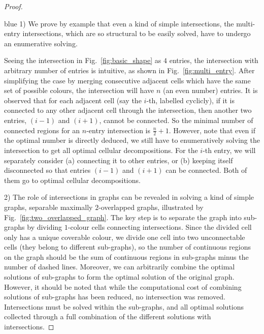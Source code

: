 \documentclass[journal]{IEEEtran}
\begin{document}
\begin{proof}
\begin{color}{blue}
1) We prove by example that even a kind of simple intersections, the multi-entry intersections, which are so structural to be easily solved, have to undergo an enumerative solving. 
\end{color}
Seeing the intersection in Fig.~\ref{fig:basic_shape} as $4$ entries, the intersection with arbitrary number of entries is intuitive, as shown in Fig.~\ref{fig:multi_entry}. 
After simplifying the case by merging consecutive adjacent cells which have the same set of possible colours, the intersection will have $n$ (an even number) entries. 
It is observed that for each adjacent cell (say the $i$-th, labelled cyclicly), if it is connected to any other adjacent cell through the intersection, then another two entries, $(i-1)$ and $(i+1)$, cannot be connected. So the minimal number of connected regions for an $n$-entry intersection is $\frac{n}{2}+1$. 
However, note that even if the optimal number is directly deduced, we still have to enumeratively solving the intersection to get all optimal cellular decompositions. 
For the $i$-th entry, we will separately consider (a) connecting it to other entries, or (b) keeping itself disconnected so that entries $(i-1)$ and $(i+1)$ can be connected. Both of them go to optimal cellular decompositions. 

2) The role of intersections in graphs can be revealed in solving a kind of simple graphs, separable maximally $2$-overlapped graphs, 
illustrated by Fig.~\ref{fig:two_overlapped_graph}.  
The key step is to separate the graph into sub-graphs by dividing $1$-colour cells connecting intersections. 
Since the divided cell only has a unique coverable colour, we divide one cell into two unconnectable cells (they belong to different sub-graphs), so the number of continuous regions on the graph should be the sum of continuous regions in sub-graphs minus the number of dashed lines. 
Moreover, we can arbitrarily combine the optimal solutions of sub-graphs to form the optimal solution of the original graph. 
However, it should be noted that while the computational cost of combining solutions of sub-graphs has been reduced, no intersection was removed. 
Intersections must be solved within the sub-graphs, and all optimal solutions collected through a full combination of the different solutions with 
intersections. %
\end{proof}
\end{document}
